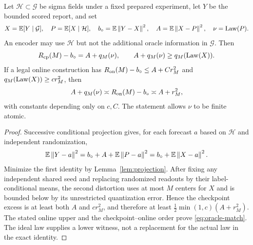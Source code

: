 \begin{proposition}\label{prop:oracle}
Let $\mathcal H\subset\mathcal G$ be sigma fields under a fixed prepared experiment, let $Y$ be the bounded scored report, and set
\[
 X=\mathbb E[Y\mid\mathcal G],\quad P=\mathbb E[X\mid\mathcal H],
 \quad b_\circ=\mathbb E\left\lVert Y-X\right\rVert^2,\quad
 A=\mathbb E\left\lVert X-P\right\rVert^2,\quad \nu=\operatorname{Law}(P).
\]
An encoder may use $\mathcal H$ but not the additional oracle information in $\mathcal G$. Then
\begin{equation}\label{eq:oracle}
 R_{\mathrm{cp}}(M)-b_\circ=A+q_M(\nu),\qquad
 A+q_M(\nu)\ge q_M(\operatorname{Law}(X)).
\end{equation}
If a legal online construction has $R_{\mathrm{on}}(M)-b_\circ\le A+C r_M^2$ and $q_M(\operatorname{Law}(X))\ge c r_M^2$, then
\begin{equation}\label{eq:oracle-match}
 A+q_M(\nu)\asymp R_{\mathrm{on}}(M)-b_\circ\asymp A+r_M^2,
\end{equation}
with constants depending only on $c,C$. The statement allows $\nu$ to be finite atomic.
\end{proposition}
\begin{proof}
Successive conditional projection gives, for each forecast $a$ based on $\mathcal H$ and independent randomization,
\[
 \mathbb E\left\lVert Y-a\right\rVert^2=b_\circ+A+\mathbb E\left\lVert P-a\right\rVert^2
                  =b_\circ+\mathbb E\left\lVert X-a\right\rVert^2.
\]
Minimize the first identity by Lemma~\ref{lem:projection}. After fixing any independent shared seed and replacing randomized readouts by their label-conditional means, the second distortion uses at most $M$ centers for $X$ and is bounded below by its unrestricted quantization error. Hence the checkpoint excess is at least both $A$ and $cr_M^2$, and therefore at least $\tfrac12\min(1,c)(A+r_M^2)$. The stated online upper and the checkpoint--online order prove \eqref{eq:oracle-match}. The ideal law supplies a lower witness, not a replacement for the actual law in the exact identity.
\end{proof}

